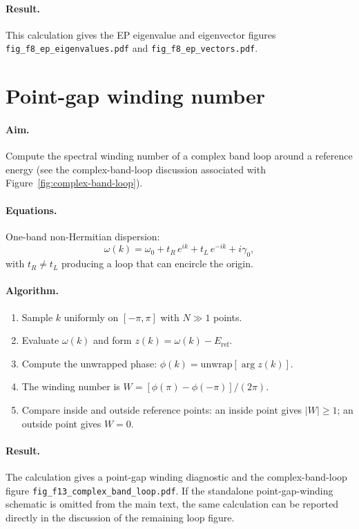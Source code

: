 \paragraph{Result.}
This calculation gives the EP eigenvalue and eigenvector figures
\texttt{fig\_f8\_ep\_eigenvalues.pdf} and
\texttt{fig\_f8\_ep\_vectors.pdf}.


\section{Point-gap winding number}
\label{sec:recipe-winding}

\paragraph{Aim.}
Compute the spectral winding number of a complex band loop around a
reference energy (see the complex-band-loop discussion associated with
Figure~\ref{fig:complex-band-loop}).

\paragraph{Equations.}
One-band non-Hermitian dispersion:
\begin{equation}
 \omega(k) = \omega_0 + t_R\,e^{ik} + t_L\,e^{-ik} + i\gamma_0,
 \label{eq:recipe-winding}
\end{equation}
with $t_R \neq t_L$ producing a loop that can encircle the origin.

\paragraph{Algorithm.}
\begin{enumerate}
 \item Sample $k$ uniformly on $[-\pi, \pi]$ with $N \gg 1$ points.
 \item Evaluate $\omega(k)$ and form $z(k) = \omega(k) - E_{\mathrm{ref}}$.
 \item Compute the unwrapped phase:
 $\phi(k) = \mathrm{unwrap}[\arg z(k)]$.
 \item The winding number is $W = [\phi(\pi) - \phi(-\pi)]/(2\pi)$.
 \item Compare inside and outside reference points: an inside point
 gives $|W| \ge 1$; an outside point gives $W = 0$.
\end{enumerate}

\paragraph{Result.}
The calculation gives a point-gap winding diagnostic and the
complex-band-loop figure \texttt{fig\_f13\_complex\_band\_loop.pdf}.
If the standalone point-gap-winding schematic is omitted from the main
text, the same calculation can be reported directly in the discussion of
the remaining loop figure.


